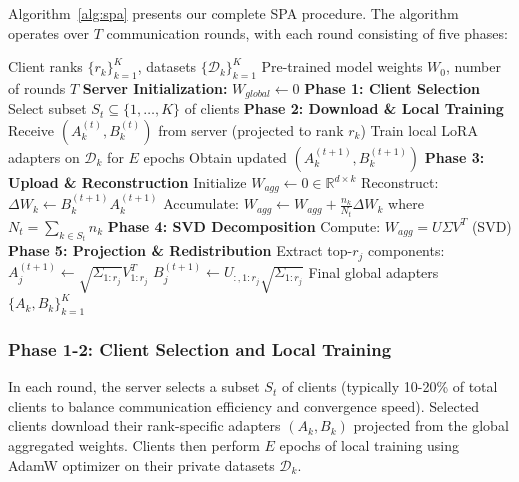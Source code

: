 \documentclass[conference]{IEEEtran}
\begin{document}
Algorithm~\ref{alg:spa} presents our complete SPA procedure. The algorithm operates over $T$ communication rounds, with each round consisting of five phases:

\begin{algorithm}[h]
\caption{Subspace Projection Aggregation (SPA)}
\label{alg:spa}
\begin{algorithmic}[1]
\REQUIRE Client ranks $\{r_k\}_{k=1}^K$, datasets $\{\mathcal{D}_k\}_{k=1}^K$
\REQUIRE Pre-trained model weights $W_0$, number of rounds $T$
\STATE \textbf{Server Initialization:} $W_{global} \leftarrow 0$
    \STATE \textbf{Phase 1: Client Selection}
    \STATE Select subset $S_t \subseteq \{1, \ldots, K\}$ of clients
    \STATE \textbf{Phase 2: Download \& Local Training}
        \STATE Receive $(A_k^{(t)}, B_k^{(t)})$ from server (projected to rank $r_k$)
        \STATE Train local LoRA adapters on $\mathcal{D}_k$ for $E$ epochs
        \STATE Obtain updated $(A_k^{(t+1)}, B_k^{(t+1)})$
    \ENDFOR
    \STATE \textbf{Phase 3: Upload \& Reconstruction}
    \STATE Initialize $W_{agg} \leftarrow 0 \in \mathbb{R}^{d \times k}$
        \STATE Reconstruct: $\Delta W_k \leftarrow B_k^{(t+1)} A_k^{(t+1)}$
        \STATE Accumulate: $W_{agg} \leftarrow W_{agg} + \frac{n_k}{N_t} \Delta W_k$
    \ENDFOR
    \STATE where $N_t = \sum_{k \in S_t} n_k$
    \STATE \textbf{Phase 4: SVD Decomposition}
    \STATE Compute: $W_{agg} = U \Sigma V^T$ \quad (SVD)
    \STATE \textbf{Phase 5: Projection \& Redistribution}
        \STATE Extract top-$r_j$ components:
        \STATE $A_j^{(t+1)} \leftarrow \sqrt{\Sigma_{1:r_j}} V^T_{1:r_j}$
        \STATE $B_j^{(t+1)} \leftarrow U_{:,1:r_j} \sqrt{\Sigma_{1:r_j}}$
    \ENDFOR
\ENDFOR
\RETURN Final global adapters $\{A_k, B_k\}_{k=1}^K$
\end{algorithmic}
\end{algorithm}

\subsubsection{Phase 1-2: Client Selection and Local Training}

In each round, the server selects a subset $S_t$ of clients (typically 10-20\% of total clients to balance communication efficiency and convergence speed). Selected clients download their rank-specific adapters $(A_k, B_k)$ projected from the global aggregated weights. Clients then perform $E$ epochs of local training using AdamW optimizer on their private datasets $\mathcal{D}_k$.
\end{document}
